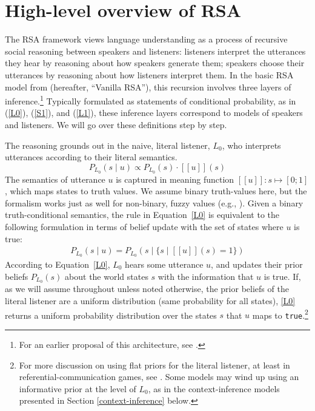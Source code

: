 \documentclass{sp}
\newcommand{\sem}[1]{\ensuremath{[\![#1]\!]}}
\begin{document}
\section{High-level overview of RSA} \label{overview}

The RSA framework views language understanding as a process of recursive social reasoning between speakers and listeners: listeners interpret the utterances they hear by reasoning about how speakers generate them; speakers choose their utterances by reasoning about how listeners interpret them. In the basic RSA model from \cite{frankgoodman2012} (hereafter, ``Vanilla RSA''), this recursion involves three layers of inference.\footnote{For an earlier proposal of this architecture, see \cite{BenzvanRooijOptimalAssertions2007}.} Typically formulated as statements of conditional probability, as in (\ref{L0}), (\ref{S1}), and (\ref{L1}), these inference layers correspond to models of speakers and listeners. We will go over these definitions step by step.

The reasoning grounds out in the naive, literal listener, $L_0$, who interprets utterances according to their literal semantics.
\begin{equation} \label{L0}
P_{L_0}(s \mid u) \propto P_{L_0}(s) \cdot \sem{u}(s)
\end{equation}
The semantics of utterance $u$ is captured in meaning function $\sem{u} \colon s \mapsto [0;1]$, which maps states to truth values.
We assume binary truth-values here, but the formalism works just as well for non-binary, fuzzy values (e.g., \citealp{degenetal2020}).
Given a binary truth-conditional semantics, the rule in Equation~\eqref{L0} is equivalent to the following formulation in terms of belief update with the set of states where $u$ is true:
\begin{align}
  \label{eq:1}
  P_{L_{0}}(s \mid u) = P_{L_{0}}(s \mid \{ s \mid \sem{u}(s) = 1\})
\end{align}
According to Equation~\eqref{L0}, $L_0$ hears some utterance $u$, and updates their prior beliefs $P_{L_{0}}(s)$ about the world states $s$ with the information that $u$ is true.
If, as we will assume throughout unless noted otherwise, the prior beliefs of the literal listener are a uniform distribution (same probability for all states), \eqref{L0} returns a uniform probability distribution over the states $s$ that $u$ maps to \texttt{true}.\footnote{For more discussion on using flat priors for the literal listener, at least in referential-communication games, see \cite{qingfranke2015}. Some models may wind up using an informative prior at the level of $L_0$, as in the context-inference models presented in Section \ref{context-inference} below.}
\end{document}
